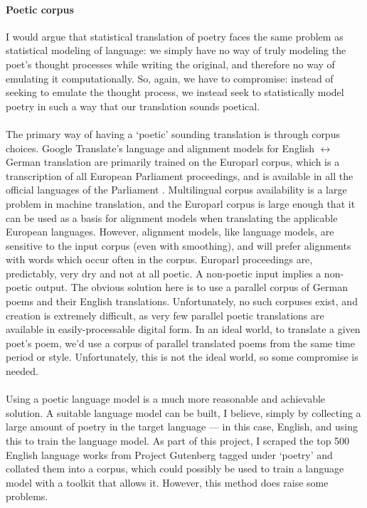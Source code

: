 \paragraph{Poetic corpus}{I would argue that statistical translation
  of poetry faces the same problem as statistical modeling of
  language: we simply have no way of truly modeling the poet's thought
  processes while writing the original, and therefore no way of
  emulating it computationally. So, again, we have to compromise:
  instead of seeking to emulate the thought process, we instead seek
  to statistically model poetry in such a way that our translation
  sounds poetical. }
\paragraph{}{The primary way of having a `poetic' sounding translation
  is through corpus choices. Google Translate's language and alignment
  models for English $\leftrightarrow$ German translation are
  primarily trained on the Europarl corpus, which is a transcription
  of all European Parliament proceedings, and is available in all the
  official languages of the Parliament \cite{parl}. Multilingual
  corpus availability is a large problem in machine translation, and
  the Europarl corpus is large enough that it can be used as a basis
  for alignment models when translating the applicable European
  languages. However, alignment models, like language models, are
  sensitive to the input corpus (even with smoothing), and will prefer
  alignments with words which occur often in the corpus. Europarl
  proceedings are, predictably, very dry and not at all poetic. A
  non-poetic input implies a non-poetic output. The obvious solution
  here is to use a parallel corpus of German poems and their English
  translations. Unfortunately, no such corpuses exist, and creation is
  extremely difficult, as very few parallel poetic translations are
  available in easily-processable digital form. In an ideal world, to
  translate a given poet's poem, we'd use a corpus of parallel
  translated poems from the same time period or style. Unfortunately,
  this is not the ideal world, so some compromise is needed. }
\paragraph{}{Using a poetic language model is a much more reasonable
  and achievable solution. A suitable language model can be built, I
  believe, simply by collecting a large amount of poetry in the target
  language --- in this case, English, and using this to train the
  language model. As part of this project, I scraped the top 500
  English language works from Project Gutenberg tagged under `poetry'
  and collated them into a corpus, which could possibly be used to
  train a language model with a toolkit that allows it. However, this
  method does raise some problems.}
